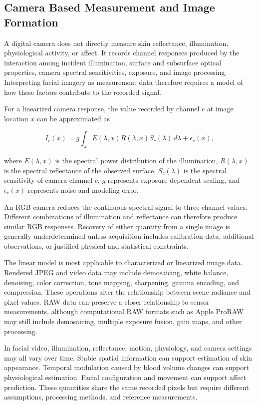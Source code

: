 \documentclass[12pt]{article}
\begin{document}
\subsection{Camera Based Measurement and Image Formation}

A digital camera does not directly measure skin reflectance, illumination, physiological activity, or affect. It records channel responses produced by the interaction among incident illumination, surface and subsurface optical properties, camera spectral sensitivities, exposure, and image processing. Interpreting facial imagery as measurement data therefore requires a model of how these factors contribute to the recorded signal.

For a linearized camera response, the value recorded by channel \(c\) at image location \(x\) can be approximated as

\begin{equation}
I_c(x)
=
g\int_{\lambda}E(\lambda,x)R(\lambda,x)S_c(\lambda)\,d\lambda
+
\epsilon_c(x),
\end{equation}

where \(E(\lambda,x)\) is the spectral power distribution of the illumination, \(R(\lambda,x)\) is the spectral reflectance of the observed surface, \(S_c(\lambda)\) is the spectral sensitivity of camera channel \(c\), \(g\) represents exposure dependent scaling, and \(\epsilon_c(x)\) represents noise and modeling error.

An RGB camera reduces the continuous spectral signal to three channel values. Different combinations of illumination and reflectance can therefore produce similar RGB responses. Recovery of either quantity from a single image is generally underdetermined unless acquisition includes calibration data, additional observations, or justified physical and statistical constraints.

The linear model is most applicable to characterized or linearized image data. Rendered JPEG and video data may include demosaicing, white balance, denoising, color correction, tone mapping, sharpening, gamma encoding, and compression. These operations alter the relationship between scene radiance and pixel values. RAW data can preserve a closer relationship to sensor measurements, although computational RAW formats such as Apple ProRAW may still include demosaicing, multiple exposure fusion, gain maps, and other processing.

In facial video, illumination, reflectance, motion, physiology, and camera settings may all vary over time. Stable spatial information can support estimation of skin appearance. Temporal modulation caused by blood volume changes can support physiological estimation. Facial configuration and movement can support affect prediction. These quantities share the same recorded pixels but require different assumptions, processing methods, and reference measurements.
\end{document}
